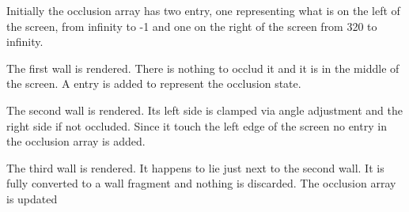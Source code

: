 Initially the occlusion array has two entry, one representing what is on the left of the screen, from infinity to -1 and one on the right of the screen from 320 to infinity.\\
\par 
\begin{minipage}{0.54\textwidth}
\centering
{}
\end{minipage}
\begin{minipage}{0.46\textwidth}
\centering
{}
\end{minipage}
\par






The first wall is rendered. There is nothing to occlud it and it is in the middle of the screen. A entry is added to represent the occlusion state.\\
\par
\begin{minipage}{0.54\textwidth}
\centering
{}
\end{minipage}
\begin{minipage}{0.46\textwidth}
\centering
{}
\end{minipage}
\par



The second wall is rendered. Its left side is clamped via angle adjustment and the right side if not occluded. Since it touch the left edge of the screen no entry in the occlusion array is added.
\par
\begin{minipage}{0.54\textwidth}
\centering
{}
\end{minipage}
\begin{minipage}{0.45\textwidth}
\centering
{}
\end{minipage}
\par





The third wall is rendered. It happens to lie just next to the second wall. It is fully converted to a wall fragment and nothing is discarded. The occlusion array is updated
\begin{minipage}{0.54\textwidth}
\centering
{}
\end{minipage}
\begin{minipage}{0.46\textwidth}
\centering
{}
\end{minipage}
\par



